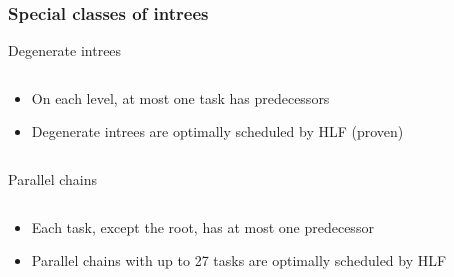 \documentclass{beamer}
\begin{document}
\begin{frame}
  \frametitle{Special classes of intrees}
  \begin{block}{Degenerate intrees}
    \begin{columns}
      \begin{column}{.8\textwidth}
        \begin{itemize}
        \item On each level, at most one task has predecessors
        \item Degenerate intrees are optimally scheduled by HLF (proven)
        \end{itemize}
      \end{column}
      \begin{column}{.2\textwidth}
        
      \end{column}
    \end{columns}
  \end{block}
  \begin{block}{Parallel chains}
    \begin{columns}
      \begin{column}{.8\textwidth}
        \begin{itemize}
        \item Each task, except the root, has at most one predecessor
        \item Parallel chains with up to 27 tasks are optimally scheduled by HLF
        \end{itemize}
      \end{column}
      \begin{column}{.2\textwidth}
        
      \end{column}
    \end{columns}
  \end{block}
\end{frame}

\end{document}
